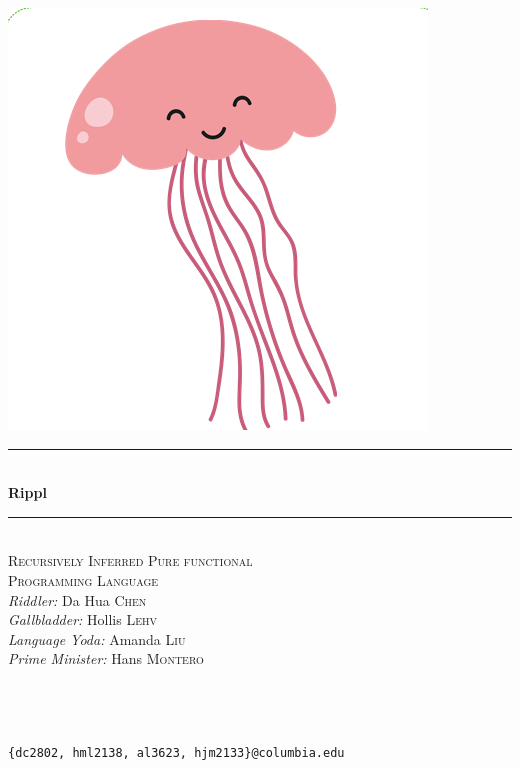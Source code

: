 \documentclass[5pt]{article}
\begin{document}
\begin{titlepage}
\begin{center}
\newcommand{\HRule}{\rule{\linewidth}{0.5mm}} %
\includegraphics[scale=.3]{rippl.png}\\

\HRule \\[0.4cm]
{ \Huge \bfseries Rippl}\\[0.2cm]
\HRule \\[0.2cm]

 \textsc{\LARGE  Recursively Inferred Pure functional \\ Programming Language}\\[1.5cm]

\large \emph{Riddler:}
Da Hua \textsc{Chen}\\
\large \emph{Gallbladder:}
Hollis \textsc{Lehv}\\
\large \emph{Language Yoda:}
Amanda \textsc{Liu}\\ 
\large \emph{Prime Minister:}
Hans \textsc{Montero}\\
\end{center}

\texttt{\\\\\\\{dc2802, hml2138, al3623, hjm2133\}@columbia.edu}
\vfill %
\end{titlepage}
\end{document}
